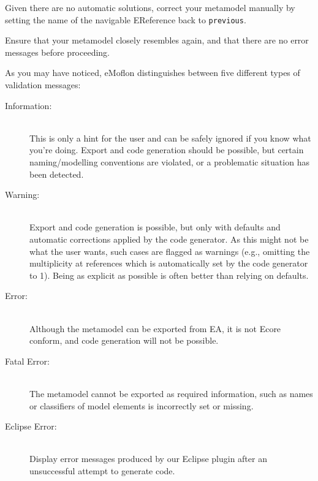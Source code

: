 \begin{stepbystep}
\item Given there are no automatic solutions, correct your metamodel manually by setting the name of the navigable EReference back to
\texttt{previous}.

\item Ensure that your metamodel closely resembles  again, and that there are no error messages before
proceeding.

\end{stepbystep}

\vspace*{1cm}

As you may have noticed, eMoflon distinguishes between five different types of validation messages:
\begin{description}
  \item[Information:]~\\
  This is only a hint for the user and can be safely ignored if you know what you're doing.
  Export and code generation should be possible, but certain naming/modelling conventions are violated, or a problematic situation has been detected.
  
  \item[Warning:]~\\ Export and code generation is possible, but only with defaults and automatic corrections applied by the code generator.
  As this might not be what the user wants, such cases are flagged as warnings (e.g., omitting the multiplicity at references which is automatically set by the
  code generator to 1).
  Being as explicit as possible is often better than relying on defaults.
  
  \item[Error:]~\\ Although the metamodel can be exported from EA, it is not Ecore conform, and code generation will not be possible.
 
  \item[Fatal Error:]~\\ The metamodel cannot be exported as required information, such as names or classifiers of model elements is incorrectly set or
  missing.
  
  \item[Eclipse Error:]~\\ Display error messages produced by our Eclipse plugin after an unsuccessful attempt to generate code. 

\end{description}

